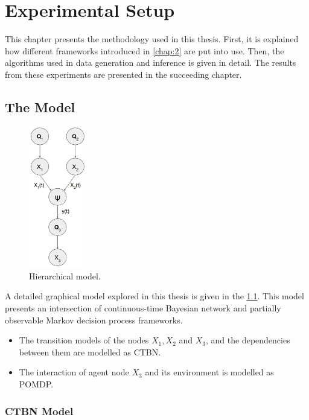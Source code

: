 
\chapter{Experimental Setup}

This chapter presents the methodology used in this thesis. First, it is explained how different frameworks introduced in \cref{chap:2} are put into use. Then, the algorithms used in data generation and inference is given in detail. The results from these experiments are presented in the succeeding chapter.

\section{The Model}
\begin{figure}
	\begin{center}
		\includegraphics[width=2.5cm]{figures/h_model}
		\caption{Hierarchical model.}
	\end{center}
	\label{fig:h_model}
\end{figure} 
A detailed graphical model explored in this thesis is given in the \cref{fig:h_model}. This model presents an intersection of continuous-time Bayesian network and partially observable Markov decision process frameworks. 
\begin{itemize}
	\item The transition models of the nodes $ X_1, X_2$ and $ X_3 $, and the dependencies between them are modelled as CTBN.
	\item The interaction of agent node $ X_3 $ and its environment is modelled as POMDP.
\end{itemize}

\subsection{CTBN Model}


